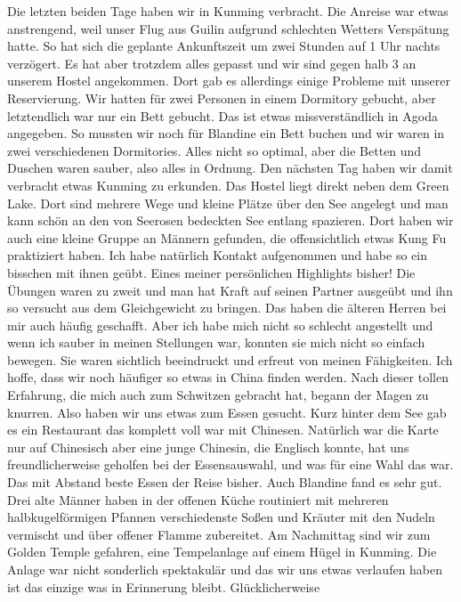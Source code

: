 \documentclass[11pt]{book}
\begin{document}
Die letzten beiden Tage haben wir in Kunming verbracht. Die Anreise war etwas anstrengend, weil unser Flug aus 
Guilin aufgrund schlechten Wetters Verspätung hatte. So hat sich die geplante Ankunftszeit um zwei Stunden auf 
1 Uhr nachts verzögert. Es hat aber trotzdem alles gepasst und wir sind gegen halb 3 an unserem Hostel angekommen.
Dort gab es allerdings einige Probleme mit unserer Reservierung. Wir hatten für zwei Personen in einem Dormitory
gebucht, aber letztendlich war nur ein Bett gebucht. Das ist etwas missverständlich in Agoda angegeben. So 
mussten wir noch für Blandine ein Bett buchen und wir waren in zwei verschiedenen Dormitories. Alles nicht so 
optimal, aber die Betten und Duschen waren sauber, also alles in Ordnung. 
Den nächsten Tag haben wir damit verbracht etwas Kunming zu erkunden. Das Hostel liegt direkt neben dem Green 
Lake. Dort sind mehrere Wege und kleine Plätze über den See angelegt und man kann schön an den von Seerosen 
bedeckten See entlang spazieren. Dort haben wir auch eine kleine Gruppe an Männern gefunden, die offensichtlich 
etwas Kung Fu praktiziert haben. Ich habe natürlich Kontakt aufgenommen und habe so ein bisschen mit ihnen geübt. 
Eines meiner persönlichen Highlights bisher! Die Übungen waren zu zweit und man hat Kraft auf seinen Partner ausgeübt 
und ihn so versucht aus dem Gleichgewicht zu bringen. Das haben die älteren Herren bei mir auch häufig 
geschafft. Aber ich habe mich nicht so schlecht angestellt und wenn ich sauber in meinen Stellungen war, konnten 
sie mich nicht so einfach bewegen. Sie waren sichtlich beeindruckt und erfreut von meinen Fähigkeiten. Ich 
hoffe, dass wir noch häufiger so etwas in China finden werden. Nach dieser tollen Erfahrung, die mich auch zum 
Schwitzen gebracht hat, begann der Magen zu knurren. Also haben wir uns etwas zum Essen gesucht. Kurz hinter dem 
See gab es ein Restaurant das komplett voll war mit Chinesen. Natürlich war die Karte nur auf Chinesisch aber 
eine junge Chinesin, die Englisch konnte, hat uns freundlicherweise geholfen bei der Essensauswahl, und was für 
eine Wahl das war. Das mit Abstand beste Essen der Reise bisher. Auch Blandine fand es sehr gut. Drei alte Männer 
haben in der offenen Küche routiniert mit mehreren halbkugelförmigen Pfannen verschiedenste Soßen und Kräuter 
mit den Nudeln vermischt und über offener Flamme zubereitet. 
Am Nachmittag sind wir zum Golden Temple gefahren, eine Tempelanlage auf einem Hügel in Kunming. Die Anlage war nicht 
sonderlich spektakulär und das wir uns etwas verlaufen haben ist das einzige was in Erinnerung bleibt. Glücklicherweise 
\end{document}
